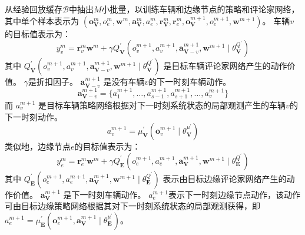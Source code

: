 从经验回放缓存$\mathcal{B}$中抽出$M$小批量，以训练车辆和边缘节点的策略和评论家网络，其中单个样本表示为 $\left(\boldsymbol{o}_{\mathbf{V}}^{m}, {o}_{e}^{m}, \boldsymbol{w}^{m}, \boldsymbol{a}_{\mathbf{V}}^{m}, {a}_{e}^{m}, \boldsymbol{r}_{\mathbf{V}}^{m}, \boldsymbol{r}_{e}^{m}, \boldsymbol{o}_{\mathbf{V}}^{m+1}, {o}_{e}^{m+1}, \boldsymbol{w}^{m+1}\right)$。
车辆$v$的目标值表示为：
\begin{equation}
	y_{v}^{m} = \boldsymbol{r}_{v}^{m} \boldsymbol{w}^{m} +\gamma Q_{\mathbf{V}}^{\prime}\left({o}_{v}^{m+1},  {a}_{v}^{m+1}, \boldsymbol{a}_{\boldsymbol{\mathbf{V}}-v}^{m+1}, \boldsymbol{w}^{m+1} \mid \theta_{\mathbf{V}}^{Q^{\prime}} \right)
\end{equation}
\noindent 其中 $Q_{\mathbf{V}}^{\prime}({o}_{v}^{m+1},  {a}_{v}^{m+1}, \boldsymbol{a}_{\boldsymbol{\mathbf{V}}-v}^{m+1}, \boldsymbol{w}^{m+1} \mid \theta_{\mathbf{V}}^{Q^{\prime}})$ 是目标车辆评论家网络产生的动作价值。
$\gamma$是折扣因子。
$\boldsymbol{a}_{\boldsymbol{\mathbf{V}}-v}^{m+1}$ 是没有车辆$v$的下一时刻车辆动作。
\begin{equation}
	\boldsymbol{a}_{\boldsymbol{\mathbf{V}}-v}^{m+1} = \{ {a}_{1}^{m+1}, \ldots, {a}_{s-1}^{m+1}, {a}_{s+1}^{m+1}, \ldots, {a}_{v}^{m+1} \}
\end{equation}
而 ${a}_{v}^{m+1}$ 是目标车辆策略网络根据对下一时刻系统状态的局部观测产生的车辆$v$的下一时刻动作。
\begin{equation}
	{a}_{v}^{m+1} = \mu_{\mathbf{V}}^{\prime}(\boldsymbol{o}_{v}^{m+1} \mid \theta_{\mathbf{V}}^{\mu^{\prime}})
\end{equation}
类似地，边缘节点$e$的目标值表示为：
\begin{equation}
	y_{e}^{m} = \boldsymbol{r}_{e}^{m} \boldsymbol{w}^{m} +\gamma Q_{\mathbf{E}}^{\prime}\left({o}_{e}^{m+1},  {a}_{e}^{m+1}, \boldsymbol{a}_{\boldsymbol{\mathbf{V}}}^{m+1}, \boldsymbol{w}^{m+1} \mid \theta_{\mathbf{E}}^{Q^{\prime}} \right)
\end{equation}
\noindent 其中 $Q_{\mathbf{E}}^{\prime}({o}_{e}^{m+1},  {a}_{e}^{m+1}, \boldsymbol{a}_{\boldsymbol{\mathbf{V}}}^{m+1}, \boldsymbol{w}^{m+1} \mid \theta_{\mathbf{E}}^{Q^{\prime}})$ 表示由目标边缘评论家网络产生的动作价值。
$\boldsymbol{a}_{\boldsymbol{\mathbf{V}}}^{m+1}$ 是下一时刻车辆动作。
${a}_{e}^{m+1}$表示下一时刻边缘节点动作，该动作可由目标边缘策略网络根据其对下一时刻系统状态的局部观测获得，即${a}_{e}^{m+1} = \mu_{\mathbf{E}}^{\prime}(\boldsymbol{o}_{e}^{m+1}, \boldsymbol{a}_{\mathbf{V}}^{m+1} \mid \theta_{\mathbf{E}}^{\mu^{\prime}})$。

